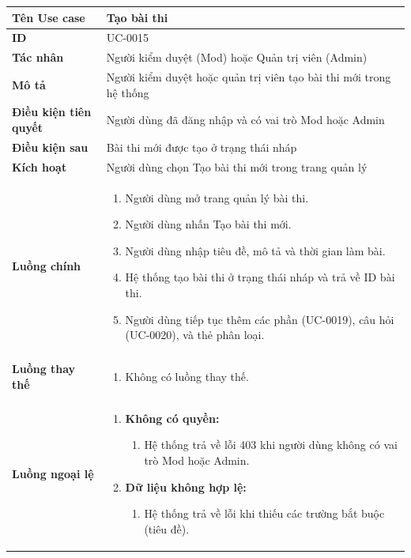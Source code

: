 {
\renewcommand{\arraystretch}{1.5}

\begin{tabularx}{\textwidth}{|>{\raggedright\arraybackslash}X|>{\raggedright\arraybackslash}X|}
\hline
\textbf{Tên Use case} & Tạo bài thi \\
\hline
\textbf{ID} & UC-0015 \\
\hline
\textbf{Tác nhân} & Người kiểm duyệt (Mod) hoặc Quản trị viên (Admin) \\
\hline
\textbf{Mô tả} & Người kiểm duyệt hoặc quản trị viên tạo bài thi mới trong hệ thống \\
\hline
\textbf{Điều kiện tiên quyết} & Người dùng đã đăng nhập và có vai trò Mod hoặc Admin \\
\hline
\textbf{Điều kiện sau} & Bài thi mới được tạo ở trạng thái nháp \\
\hline
\textbf{Kích hoạt} & Người dùng chọn Tạo bài thi mới trong trang quản lý \\
\hline
\textbf{Luồng chính} &
\begin{enumerate}
    \item Người dùng mở trang quản lý bài thi.
    \item Người dùng nhấn Tạo bài thi mới.
    \item Người dùng nhập tiêu đề, mô tả và thời gian làm bài.
    \item Hệ thống tạo bài thi ở trạng thái nháp và trả về ID bài thi.
    \item Người dùng tiếp tục thêm các phần (UC-0019), câu hỏi (UC-0020), và thẻ phân loại.
\end{enumerate} \\
\hline
\textbf{Luồng thay thế} &
\begin{enumerate}
    \item Không có luồng thay thế.
\end{enumerate} \\
\hline
\textbf{Luồng ngoại lệ} &
\begin{enumerate}
    \item \textbf{Không có quyền:}
    \begin{enumerate}
        \item[2Err.] Hệ thống trả về lỗi 403 khi người dùng không có vai trò Mod hoặc Admin.
    \end{enumerate}
    \item \textbf{Dữ liệu không hợp lệ:}
    \begin{enumerate}
        \item[4Err.] Hệ thống trả về lỗi khi thiếu các trường bắt buộc (tiêu đề).
    \end{enumerate}
\end{enumerate} \\
\hline
\end{tabularx}
}
